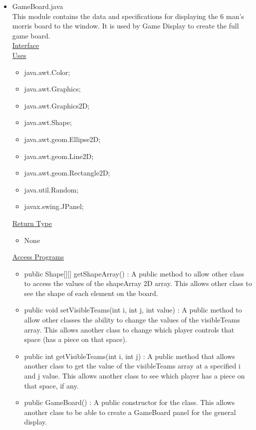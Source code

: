 \documentclass[12pt]{article}
\begin{document}
\begin{itemize}
\begin{itemize}
		\end{itemize}
		\item GameBoard.java \\
		This module contains the data and specifications for displaying the 6 man's morris board to the window. It is used by Game Display to create the full game board. \\
		\underline{Interface} \\
		\underline{Uses}
		\begin{itemize}
			\item java.awt.Color;
			\item java.awt.Graphics;
			\item java.awt.Graphics2D;
			\item java.awt.Shape; 
			\item java.awt.geom.Ellipse2D;
			\item java.awt.geom.Line2D;
			\item java.awt.geom.Rectangle2D;
			\item java.util.Random;
			\item javax.swing.JPanel;
		\end{itemize} 
		\underline{Return Type}
		\begin{itemize}
			\item None
		\end{itemize}
		\underline{Access Programs}
		\begin{itemize}
			\item public Shape[][] getShapeArray() : A public method to allow other class to access the values of the shapeArray 2D array. This allows other class to see the shape of each element on the board.
			\item public void setVisibleTeams(int i, int j, int value) : A public method to allow other classes the ability to change the values of the  visibleTeams array. This allows another class to change which player controls that space (has a piece on that space).
			\item public int getVisibleTeams(int i, int j) : A public method that allows another class to get the value of the visibleTeams array at a specified i and j value. This allows another class to see which player has a piece on that space, if any.
			\item public GameBoard() : A public constructor for the class. This allows another class to be able to create a GameBoard panel for the general display.


\end{itemize}
\end{itemize}
\end{document}
